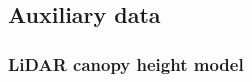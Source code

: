 
% 






\subsection{Auxiliary data}
\label{sec:auxinfo}

\subsubsection{LiDAR canopy height model}
\label{sec:chm}

